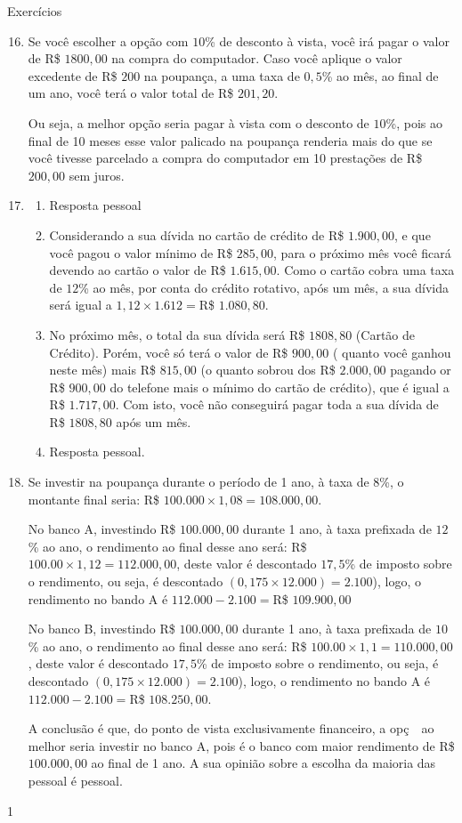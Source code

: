 \clearpage
\begin{resposta}{Exercícios}
{
  \begin{enumerate}\setcounter{enumi}{15}
    \item Se você escolher a opção com $10$\% de desconto à vista, você irá pagar o valor de R\$ $1800{,}00$ na compra do computador. Caso você aplique o valor excedente de R\$ $200$ na poupança, a uma taxa de $0{,}5$\% ao mês, ao final de um ano, você terá o valor total de R\$ $201{,}20$.

    Ou seja, a melhor opção seria pagar à vista com o desconto de $10$\%, pois ao final de 10 meses esse valor palicado na poupança renderia mais do que se você tivesse parcelado a compra do computador em 10 prestações de R\$ $200{,}00$ sem juros.

    \item
    \begin{enumerate}
      \item Resposta pessoal
      \item Considerando a sua dívida no cartão de crédito de R\$ $1.900{,}00$, e que você pagou o valor mínimo de R\$ $285{,}00$, para o próximo mês você ficará devendo ao cartão o valor de R\$ $1.615{,}00$. Como o cartão cobra uma taxa de $12$\% ao mês, por conta do crédito rotativo, após um mês, a sua dívida será igual a $1{,}12\times1.612=$R\$ $1.080{,}80$.
      \item No próximo mês, o total da sua dívida será R\$ $1808{,}80$ (Cartão de Crédito). Porém, você só terá o valor de R\$ $900{,}00$ ( quanto você ganhou neste mês) mais R\$ $815{,}00$ (o quanto sobrou dos R\$ $2.000{,}00$ pagando or R\$ $900,00$ do telefone mais o mínimo do cartão de crédito), que é igual a R\$ $1.717{,}00$. Com isto, você não conseguirá pagar toda a sua dívida de R\$ $1808{,}80$ após um mês.
      \item Resposta pessoal.
    \end{enumerate}
    \item Se investir na poupança durante o período de 1 ano, à taxa de $8$\%, o montante final seria: R\$ $100.000\times1{,}08=108.000{,}00$.

    No banco A, investindo R\$ $100.000{,}00$ durante 1 ano, à taxa prefixada de $12$\% ao ano, o rendimento ao final desse ano será: R\$ $100.00\times1{,}12=112.000{,}00$, deste valor é descontado $17{,}5$\% de imposto sobre o rendimento, ou seja, é descontado $(0{,}175\times12.000)=2.100$), logo, o rendimento no bando A é $112.000-2.100=$R\$ $109.900{,}00$

    No banco B, investindo R\$ $100.000{,}00$ durante 1 ano, à taxa prefixada de $10$\% ao ano, o rendimento ao final desse ano será: R\$ $100.00\times1{,}1=110.000{,}00$, deste valor é descontado $17{,}5$\% de imposto sobre o rendimento, ou seja, é descontado $(0{,}175\times12.000)=2.100$), logo, o rendimento no bando A é $112.000-2.100=$R\$ $108.250{,}00$.

    A conclusão é que, do ponto de vista exclusivamente financeiro, a opç~~ao melhor seria investir no banco A, pois é o banco com maior rendimento de R\$ $100.000{,}00$ ao final de 1 ano. A sua opinião sobre a escolha da maioria das pessoal é pessoal.
  \end{enumerate}
}{1}
\end{resposta}

